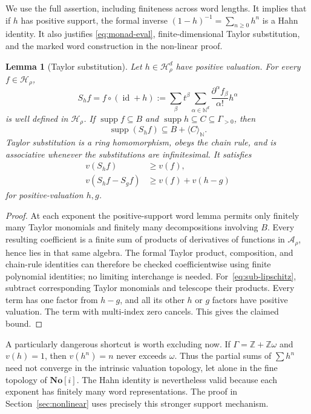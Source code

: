 \documentclass[11pt,letterpaper]{article}
\newtheorem{lemma}[theorem]{Lemma}
\theoremstyle{definition}
\theoremstyle{remark}
\newcommand{\No}{\mathbf{No}}
\newcommand{\Z}{\mathbb Z}
\newcommand{\N}{\mathbb N}
\newcommand{\A}{\mathcal A}
\newcommand{\HH}{\mathcal H}
\newcommand{\supp}{\operatorname{supp}}
\newcommand{\id}{\operatorname{id}}
\newcommand{\mon}[1]{\langle #1\rangle_{\N}}
\numberwithin{equation}{section}
\begin{document}
We use the full assertion, including finiteness across word lengths.  It
implies that if $h$ has positive support, the formal inverse
$(1-h)^{-1}=\sum_{n\ge0}h^n$ is a Hahn identity.  It also justifies
\eqref{eq:monad-eval}, finite-dimensional Taylor substitution, and the marked
word construction in the non-linear proof.

\begin{lemma}[Taylor substitution]\label{lem:taylor}
Let $h\in\HH_\rho^d$ have positive valuation.  For every $f\in\HH_\rho$,
\begin{equation}\label{eq:substitution}
 S_hf=f\circ(\id+h):=
 \sum_\beta t^\beta
 \sum_{\alpha\in\N^d}
 \frac{\partial^\alpha f_\beta}{\alpha!}h^\alpha
\end{equation}
is well defined in $\HH_\rho$.  If $\supp f\subseteq B$ and
$\supp h\subseteq C\subseteq\Gamma_{>0}$, then
\[
 \supp(S_hf)\subseteq B+\mon C.
\]
Taylor substitution is a ring homomorphism, obeys the chain rule, and is
associative whenever the substitutions are infinitesimal.  It satisfies
\begin{align}
 v(S_hf)&\ge v(f),\label{eq:sub-order}\\
 v(S_hf-S_gf)&\ge v(f)+v(h-g)\label{eq:sub-lipschitz}
\end{align}
for positive-valuation $h,g$.
\end{lemma}
\begin{proof}
At each exponent the positive-support word lemma permits only finitely
many Taylor monomials and finitely many decompositions involving $B$.
Every resulting coefficient is a finite sum of products of derivatives of
functions in $\A_\rho$, hence lies in that same algebra.  The formal
Taylor product, composition, and chain-rule identities can therefore be
checked coefficientwise using finite polynomial identities; no limiting
interchange is needed.  For~\eqref{eq:sub-lipschitz}, subtract corresponding
Taylor monomials and telescope their products.  Every term has one factor
from $h-g$, and all its other $h$ or $g$ factors have positive valuation.
The term with multi-index zero cancels.  This gives the claimed bound.
\end{proof}

A particularly dangerous shortcut is worth excluding now.  If
$\Gamma=\Z+\Z\omega$ and $v(h)=1$, then $v(h^n)=n$ never exceeds $\omega$.
Thus the partial sums of $\sum h^n$ need not converge in the intrinsic
valuation topology, let alone in the fine topology of $\No[i]$.  The Hahn
identity is nevertheless valid because each exponent has finitely many word
representations.  The proof in Section~\ref{sec:nonlinear} uses precisely
this stronger support mechanism.
\end{document}
